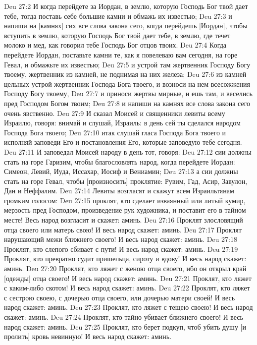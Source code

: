 Deu 27:2  И когда перейдете за Иордан, в землю, которую Господь Бог твой дает тебе, тогда поставь себе большие камни и обмажь их известью;
Deu 27:3  и напиши на [камнях] сих все слова закона сего, когда перейдешь [Иордан], чтобы вступить в землю, которую Господь Бог твой дает тебе, в землю, где течет молоко и мед, как говорил тебе Господь Бог отцов твоих.
Deu 27:4  Когда перейдете Иордан, поставьте камни те, как я повелеваю вам сегодня, на горе Гевал, и обмажьте их известью;
Deu 27:5  и устрой там жертвенник Господу Богу твоему, жертвенник из камней, не поднимая на них железа;
Deu 27:6  из камней цельных устрой жертвенник Господа Бога твоего, и возноси на нем всесожжения Господу Богу твоему,
Deu 27:7  и приноси жертвы мирные, и ешь там, и веселись пред Господом Богом твоим;
Deu 27:8  и напиши на камнях все слова закона сего очень явственно.
Deu 27:9  И сказал Моисей и священники левиты всему Израилю, говоря: внимай и слушай, Израиль: в день сей ты сделался народом Господа Бога твоего;
Deu 27:10  итак слушай гласа Господа Бога твоего и исполняй заповеди Его и постановления Его, которые заповедую тебе сегодня.
Deu 27:11  И заповедал Моисей народу в день тот, говоря:
Deu 27:12  сии должны стать на горе Гаризим, чтобы благословлять народ, когда перейдете Иордан: Симеон, Левий, Иуда, Иссахар, Иосиф и Вениамин;
Deu 27:13  а сии должны стать на горе Гевал, чтобы [произносить] проклятие: Рувим, Гад, Асир, Завулон, Дан и Неффалим.
Deu 27:14  Левиты возгласят и скажут всем Израильтянам громким голосом:
Deu 27:15  проклят, кто сделает изваянный или литый кумир, мерзость пред Господом, произведение рук художника, и поставит его в тайном месте! Весь народ возгласит и скажет: аминь.
Deu 27:16  Проклят злословящий отца своего или матерь свою! И весь народ скажет: аминь.
Deu 27:17  Проклят нарушающий межи ближнего своего! И весь народ скажет: аминь.
Deu 27:18  Проклят, кто слепого сбивает с пути! И весь народ скажет: аминь.
Deu 27:19  Проклят, кто превратно судит пришельца, сироту и вдову! И весь народ скажет: аминь.
Deu 27:20  Проклят, кто ляжет с женою отца своего, ибо он открыл край [одежды] отца своего! И весь народ скажет: аминь.
Deu 27:21  Проклят, кто ляжет с каким-либо скотом! И весь народ скажет: аминь.
Deu 27:22  Проклят, кто ляжет с сестрою своею, с дочерью отца своего, или дочерью матери своей! И весь народ скажет: аминь.
Deu 27:23  Проклят, кто ляжет с тещею своею! И весь народ скажет: аминь.
Deu 27:24  Проклят, кто тайно убивает ближнего своего! И весь народ скажет: аминь.
Deu 27:25  Проклят, кто берет подкуп, чтоб убить душу [и пролить] кровь невинную! И весь народ скажет: аминь.
